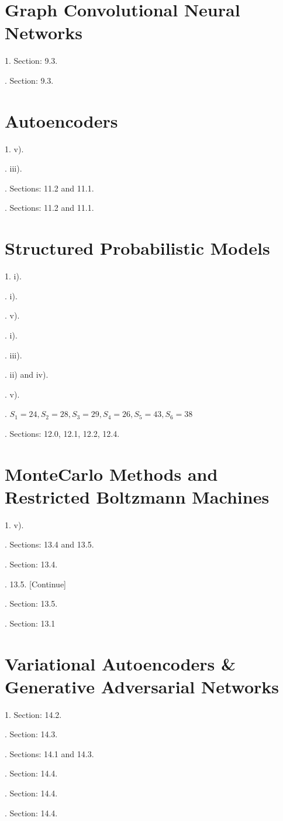 \section{ Graph Convolutional Neural Networks}

1. Section: 9.3.

. Section: 9.3.

\section{ Autoencoders}

1. v).

. iii).

. Sections: 11.2 and 11.1.

. Sections: 11.2 and 11.1.

\section{ Structured Probabilistic Models}

1. i).

. i).

. v).

. i).

. iii).

. ii) and iv).

. v).

. $S_1 = 24, S_2 = 28, S_3=29, S_4=26, S_5=43, S_6=38$

. Sections: 12.0, 12.1, 12.2, 12.4.

\section{ MonteCarlo Methods and Restricted Boltzmann Machines}

1. v).

. Sections: 13.4 and 13.5.

. Section: 13.4.

. 13.5. [Continue]

. Section: 13.5.

. Section: 13.1

\section{ Variational Autoencoders \& Generative Adversarial Networks}

1. Section: 14.2.

. Section: 14.3.

. Sections: 14.1 and 14.3.

. Section: 14.4.

. Section: 14.4.

. Section: 14.4.

